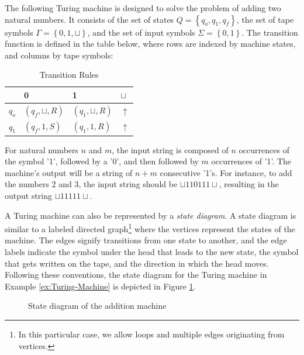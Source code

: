 \begin{example}
\label{ex:Turing-Machine}
The following Turing machine is designed to solve the problem of adding two natural numbers. It consists of the set of states $Q = \left\{q_{o}, q_{1}, q_{f}\right\}$, the set of tape symbols $\Gamma = \left\{0, 1, \sqcup \right\}$, and the set of input symbols $\Sigma = \left\{0, 1 \right\}$. The transition function is defined in the table below, where rows are indexed by machine states, and columns by tape symbols:

\begin{table}[h]
\centering
\begin{tabular}{l l l l}
\toprule
 & 0 & 1 & $\sqcup$ \\
\midrule
$q_{o}$ & $\left(q_{f}, \sqcup, R\right)$ & $\left(q_{1}, \sqcup, R\right)$ & $\uparrow$ \\
$q_{1}$ & $\left(q_{f}, 1     , S\right)$ & $\left(q_{1}, 1     , R\right)$ & $\uparrow$ \\
\bottomrule
\end{tabular}
\caption{Transition Rules}
\end{table}

For natural numbers $n$ and $m$, the input string is composed of $n$ occurrences of the symbol '1', followed by a '0', and then followed by $m$ occurrences of '1'. The machine's output will be a string of $n+m$ consecutive '1's. For instance, to add the numbers 2 and 3, the input string should be $\sqcup 1 1 0 1 1 1 \sqcup$, resulting in the output string $\sqcup 1 1 1 1 1 \sqcup$.
\end{example}

A Turing machine can also be represented by a \emph{state diagram}. A state diagram is similar to a labeled directed graph\footnote{In this particular case, we allow loops and multiple edges originating from vertices.} where the vertices represent the states of the machine. The edges signify transitions from one state to another, and the edge labels indicate the symbol under the head that leads to the new state, the symbol that gets written on the tape, and the direction in which the head moves. Following these conventions, the state diagram for the Turing machine in Example \ref{ex:Turing-Machine} is depicted in Figure \ref{fig:Example-Turing-Machine}.

\begin{figure}[t]
\centering
{}
\caption{\label{fig:Example-Turing-Machine}State diagram of the addition machine}
\end{figure}

